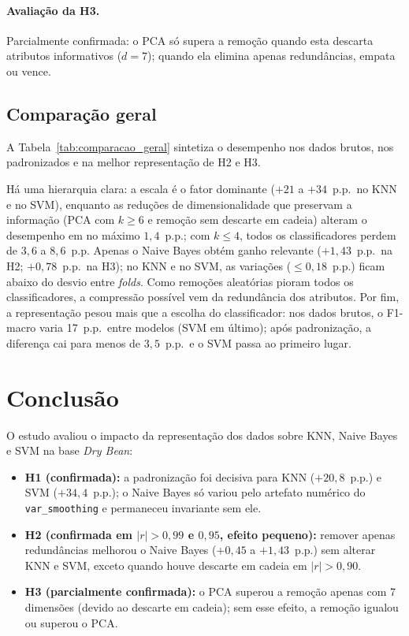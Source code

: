 \documentclass[11pt,a4paper]{article}
\begin{document}
\paragraph{Avaliação da H3.}
Parcialmente confirmada: o PCA só supera a remoção quando esta descarta atributos informativos ($d=7$); quando ela elimina apenas redundâncias,
empata ou vence.

\subsection{Comparação geral}\label{sec:geral}

A Tabela~\ref{tab:comparacao_geral} sintetiza o desempenho nos dados brutos, nos padronizados e na melhor representação de H2 e H3.




Há uma hierarquia clara: a escala é o fator dominante ($+21$ a $+34$~p.p.\ no KNN e no SVM), enquanto as reduções de dimensionalidade que preservam a
informação (PCA com $k \ge 6$ e remoção sem descarte em cadeia) alteram o desempenho em no máximo $1{,}4$~p.p.; com $k \le 4$, todos os classificadores
perdem de $3{,}6$ a $8{,}6$~p.p. Apenas o Naive Bayes obtém ganho relevante ($+1{,}43$~p.p.\ na H2; $+0{,}78$~p.p.\ na H3); no KNN e no SVM, as variações ($\le 0{,}18$~p.p.) 
ficam abaixo do desvio entre \textit{folds}. Como remoções aleatórias pioram todos os classificadores, a compressão possível vem da redundância
dos atributos. Por fim, a representação pesou mais que a 
escolha do classificador: nos dados brutos, o F1-macro varia 17~p.p.\ entre modelos (SVM em último); após padronização, a diferença cai para menos de 
$3{,}5$~p.p.\ e o SVM passa ao primeiro lugar.
\section{Conclusão}
\label{sec:conclusao}

O estudo avaliou o impacto da representação dos dados sobre KNN, Naive Bayes e SVM na base \textit{Dry Bean}:

\begin{itemize}
    \item \textbf{H1 (confirmada):} a padronização foi decisiva para KNN ($+20{,}8$~p.p.) e SVM ($+34{,}4$~p.p.); o Naive Bayes só variou pelo artefato numérico do \texttt{var\_smoothing} e permaneceu invariante sem ele.
    \item \textbf{H2 (confirmada em $|r|>0{,}99$ e $0{,}95$, efeito pequeno):} remover apenas redundâncias melhorou o Naive Bayes ($+0{,}45$ a $+1{,}43$~p.p.) sem alterar KNN e SVM, exceto quando houve descarte em cadeia em $|r|>0{,}90$.
    \item \textbf{H3 (parcialmente confirmada):} o PCA superou a remoção apenas com 7 dimensões (devido ao descarte em cadeia); sem esse efeito, a remoção igualou ou superou o PCA.
\end{itemize}
\end{document}
